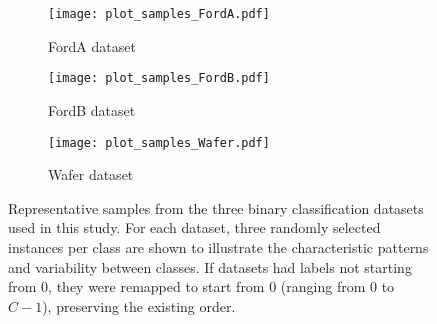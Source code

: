 \begin{figure}[!htbp]
    \centering
    \begin{subfigure}[b]{\textwidth}
        \centering
        \texttt{[image: plot\_samples\_FordA.pdf]}
        \caption{FordA dataset}
        \label{fig:samples_forda}
    \end{subfigure}
    \vspace{0.8em}
    \begin{subfigure}[b]{\textwidth}
        \centering
        \texttt{[image: plot\_samples\_FordB.pdf]}
        \caption{FordB dataset}
        \label{fig:samples_fordb}
    \end{subfigure}
    \vspace{0.8em}
    \begin{subfigure}[b]{\textwidth}
        \centering
        \texttt{[image: plot\_samples\_Wafer.pdf]}
        \caption{Wafer dataset}
        \label{fig:samples_wafer}
    \end{subfigure}
    \caption{Representative samples from the three binary classification datasets used in this study. For each dataset, three randomly selected instances per class are shown to illustrate the characteristic patterns and variability between classes. If datasets had labels not starting from 0, they were remapped to start from 0 (ranging from 0 to $C-1$), preserving the existing order.}
    \label{fig:samples_binary}
\end{figure}